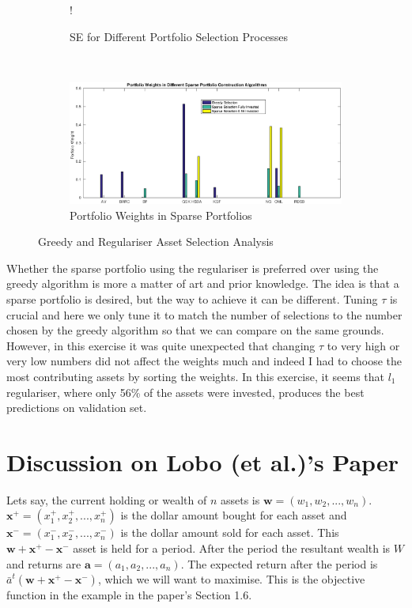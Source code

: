 \documentclass[11pt]{article}
\begin{document}
\begin{figure}[!h]
   \centering 
   \begin{subfigure}[b]{0.35\textwidth}
     	\resizebox {\textwidth} {!} { }
		\caption{SE for Different Portfolio Selection Processes}
		\label{fig:q3-rmse}
    \end{subfigure}
    ~
    \begin{subfigure}[b]{0.6\textwidth}
		\includegraphics[scale=.42] {q3_weights1.eps}
		\caption{Portfolio Weights in Sparse Portfolios}
		\label{fig:q3-weights}
    \end{subfigure}
    \caption{Greedy and Regulariser Asset Selection Analysis}
	\label{fig:q3-analysis}	
	\vspace{-0.4cm}
\end{figure}

Whether the sparse portfolio using the regulariser is preferred over using the greedy algorithm is more a matter of art and prior 
knowledge. The idea is that a sparse portfolio is desired, but the way to achieve it can be different. Tuning $\tau$ is crucial and
here we only tune it to match the number of selections to the number chosen by the greedy algorithm so that we can compare
on the same grounds. However, in this exercise it was quite unexpected that changing $\tau$ to very high or very low numbers did not 
affect the weights much and indeed I had to choose the most contributing assets by sorting the weights. In this exercise, it seems that
$l_1$ regulariser, where only 56\% of the assets were invested, produces the best predictions on validation set.

\section{Discussion on Lobo (et al.)'s Paper}

Lets say, the current holding or wealth of $n$ assets is $\bm{w} = (w_1, w_2, ..., w_n)$. $\bm{x^+} = (x^+_1, x^+_2, ..., x^+_n)$ is
the dollar amount bought for each asset and $\bm{x^-} = (x^-_1, x^-_2, ..., x^-_n)$ is the dollar amount sold for each asset. This
$\bm{w} + \bm{x^+} - \bm{x^-}$ asset is held for a period. After the period the resultant wealth is $W$ and returns are $\bm{a} = (a_1, a_2, ..., a_n)$.
The expected return after the period is $\bar{a}^t(\bm{w} + \bm{x^+} - \bm{x^-})$, which we will want to maximise. This is the objective function
in the example in the paper's Section 1.6.\\
\end{document}
